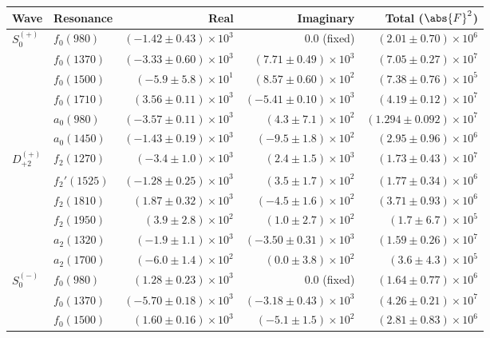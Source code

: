 \begin{table}[ht]
    \begin{center}
        \begin{tabular}{llrrr}\toprule
        Wave & Resonance & Real & Imaginary & Total ($\abs{F}^2$) \\\midrule
$S_{0}^{(+)}$ & $f_{0}(980)$ & $(-1.42 \pm 0.43) \times 10^{3}$ & $0.0$ (fixed) & $(2.01 \pm 0.70) \times 10^{6}$ \\
 & $f_{0}(1370)$ & $(-3.33 \pm 0.60) \times 10^{3}$ & $(7.71 \pm 0.49) \times 10^{3}$ & $(7.05 \pm 0.27) \times 10^{7}$ \\
 & $f_{0}(1500)$ & $(-5.9 \pm 5.8) \times 10^{1}$ & $(8.57 \pm 0.60) \times 10^{2}$ & $(7.38 \pm 0.76) \times 10^{5}$ \\
 & $f_{0}(1710)$ & $(3.56 \pm 0.11) \times 10^{3}$ & $(-5.41 \pm 0.10) \times 10^{3}$ & $(4.19 \pm 0.12) \times 10^{7}$ \\
 & $a_{0}(980)$ & $(-3.57 \pm 0.11) \times 10^{3}$ & $(4.3 \pm 7.1) \times 10^{2}$ & $(1.294 \pm 0.092) \times 10^{7}$ \\
 & $a_{0}(1450)$ & $(-1.43 \pm 0.19) \times 10^{3}$ & $(-9.5 \pm 1.8) \times 10^{2}$ & $(2.95 \pm 0.96) \times 10^{6}$ \\
$D_{+2}^{(+)}$ & $f_{2}(1270)$ & $(-3.4 \pm 1.0) \times 10^{3}$ & $(2.4 \pm 1.5) \times 10^{3}$ & $(1.73 \pm 0.43) \times 10^{7}$ \\
 & $f_{2}'(1525)$ & $(-1.28 \pm 0.25) \times 10^{3}$ & $(3.5 \pm 1.7) \times 10^{2}$ & $(1.77 \pm 0.34) \times 10^{6}$ \\
 & $f_{2}(1810)$ & $(1.87 \pm 0.32) \times 10^{3}$ & $(-4.5 \pm 1.6) \times 10^{2}$ & $(3.71 \pm 0.93) \times 10^{6}$ \\
 & $f_{2}(1950)$ & $(3.9 \pm 2.8) \times 10^{2}$ & $(1.0 \pm 2.7) \times 10^{2}$ & $(1.7 \pm 6.7) \times 10^{5}$ \\
 & $a_{2}(1320)$ & $(-1.9 \pm 1.1) \times 10^{3}$ & $(-3.50 \pm 0.31) \times 10^{3}$ & $(1.59 \pm 0.26) \times 10^{7}$ \\
 & $a_{2}(1700)$ & $(-6.0 \pm 1.4) \times 10^{2}$ & $(0.0 \pm 3.8) \times 10^{2}$ & $(3.6 \pm 4.3) \times 10^{5}$ \\
$S_{0}^{(-)}$ & $f_{0}(980)$ & $(1.28 \pm 0.23) \times 10^{3}$ & $0.0$ (fixed) & $(1.64 \pm 0.77) \times 10^{6}$ \\
 & $f_{0}(1370)$ & $(-5.70 \pm 0.18) \times 10^{3}$ & $(-3.18 \pm 0.43) \times 10^{3}$ & $(4.26 \pm 0.21) \times 10^{7}$ \\
 & $f_{0}(1500)$ & $(1.60 \pm 0.16) \times 10^{3}$ & $(-5.1 \pm 1.5) \times 10^{2}$ & $(2.81 \pm 0.83) \times 10^{6}$ \\

\end{tabular}
\end{center}
\end{table}
